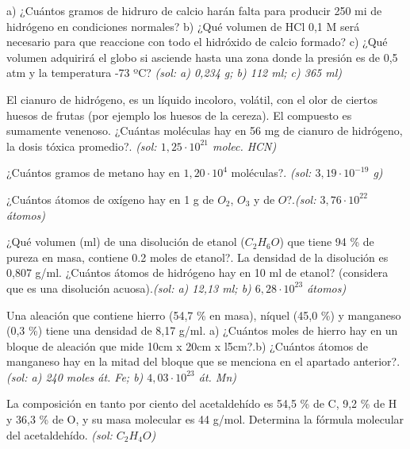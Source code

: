 \begin{multicols}{2}
\begin{problem}
a)	¿Cuántos gramos de hidruro de calcio harán falta para producir 250 mi de hidrógeno en condiciones normales?
b)	¿Qué volumen de HCl 0,1 M será necesario para que reaccione con todo el hidróxido de calcio formado?
c)	¿Qué volumen adquirirá el globo si asciende hasta una zona donde la presión es de 0,5 atm y la temperatura -73 ºC? \textit{\scriptsize(sol: a) 0,234 g; b) 112 ml; c) 365 ml)}
\end{problem}
\begin{problem}
El cianuro de hidrógeno, es un líquido incoloro, volátil, con el olor de ciertos huesos de frutas (por ejemplo los huesos de la cereza). El compuesto es sumamente venenoso. ¿Cuántas moléculas hay en 56 mg de cianuro de hidrógeno, la dosis tóxica promedio?. \textit{\scriptsize(sol: $1,25\cdot10^{21}$ molec. HCN)}
\end{problem}
\begin{problem}
¿Cuántos gramos de metano hay en $1,20\cdot 10^4$ moléculas?. \textit{\scriptsize(sol: $3,19\cdot10^{-19}$ g)}
\end{problem}
\begin{problem}
¿Cuántos átomos de oxígeno hay en 1 g de $O_2$, $O_3$ y de $O$?.\textit{\scriptsize(sol: $3,76\cdot10^{22}$ átomos)}	
\end{problem}
\begin{problem}
¿Qué volumen (ml) de una disolución de etanol ($C_2H_6O$) que tiene 94 \% de pureza en masa, contiene 0.2 moles de etanol?. La densidad de la disolución es 0,807 g/ml. ¿Cuántos átomos de hidrógeno hay en 10 ml de etanol? (considera que es una disolución acuosa).\textit{\scriptsize(sol: a) 12,13 ml; b) $6,28\cdot10^{23}$ átomos)}	
\end{problem}
\begin{problem}
Una aleación que contiene hierro (54,7 \% en masa), níquel (45,0 \%) y manganeso (0,3 \%) tiene una densidad de 8,17 g/ml. a) ¿Cuántos moles de hierro hay en un bloque de aleación que mide 10cm x 20cm x l5cm?.b) ¿Cuántos átomos de manganeso hay en la mitad del bloque que se menciona en el apartado anterior?. \textit{\scriptsize(sol: a) 240 moles át. Fe; b) $4,03\cdot10^{23}$ át. Mn)}	
\end{problem}
\begin{problem}
La composición en tanto por ciento del acetaldehído es 54,5 \% de C, 9,2 \% de H y 36,3 \% de O, y su masa molecular es 44 g/mol. Determina la fórmula molecular del acetaldehído. \textit{\scriptsize(sol: $C_2H_4O$)}
\end{problem}
\begin{problem}

\end{problem}
\end{multicols}
